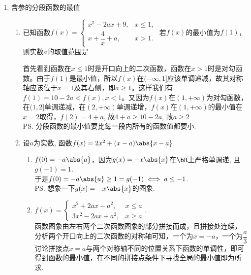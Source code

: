 \begin{enumerate}
\item 含参的分段函数的最值
\begin{enumerate}
    \item 已知函数$f(x) = \left\{  
         \begin{array}{ll}  
            x^2-2ax+9, & x \leq 1, \\  
            x+\dfrac{4}{x}+a, & x > 1.
         \end{array}
    \right.$ 若$f(x)$的最小值为$f(1)$，则实数$a$的取值范围是\blkda{$[2, +\infty)$}
    \begin{jieda}
        首先看到函数在$x \leq 1$时是开口向上的二次函数，函数在$x > 1$时是对勾函数。由于$f(1)$是最小值，所以$f(x)$在$(-\infty, 1]$应该单调递减，故其对称轴应该位于$x=1$及其右侧，即$a \geq 1$。这样我们有$f(1) = 10-2a < f(x), x < 1$。又因为$f(x)$在$(1, +\infty)$为对勾函数，在$(1, 2]$单调递减，在$(2, +\infty)$单调递增，$f(x)$在$(1, +\infty)$的最小值在$x = 2$取得，$f(2) = 4+a$, 故$4+a \geq 10-2a$, 故$a \geq 2$ \\
        \ps 分段函数的最小值要比每一段内所有的函数值都要小.
    \end{jieda}
    \item 设$a$为实数, 函数$f(x)=2x^2+(x-a)\abs{x-a}$. \\
    \begin{jieda}
    \begin{enumerate}[1.]
    \item $f(0)=-a\abs{a}$，因为$g(x)=-x\abs{x}$在$\bR$上严格单调递, 且$g(-1)=1$. \\
    于是$f(0)=-a\abs{a}\geq 1=g(-1)\iff a\leq -1$.  \\
    \ps 想象一下$g(x)=-x\abs{x}$的图象.
    \item $f(x)=\begin{cases}
    x^2+2ax-a^2, & x\leq a\\
    3x^2-2ax+a^2, & x\geq a
    \end{cases}$. \\
    函数图象由左右两个二次函数图象的部分拼接而成，且拼接处连续，分析两个开口向上的二次函数的对称轴可知，一个为$x = -a$，一个为$\dfrac{a}{3}$ \\
    讨论拼接点$x = a$与两个对称轴不同的位置关系下函数的单调性，即可得到函数的最小值，在不同的拼接点条件下寻找全局的最小值即为所求. 

\end{enumerate}
\end{jieda}
\end{enumerate}
\end{enumerate}
